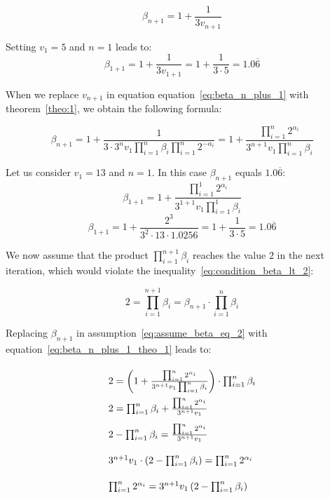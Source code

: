 \begin{equation}
\label{eq:beta_n_plus_1}
\beta_{n+1}=1+\frac{1}{3v_{n+1}}
\end{equation}

\begin{example}
	Setting $v_1=5$ and $n=1$ leads to:
	\[
	\beta_{1+1}=1+\frac{1}{3v_{1+1}}=1+\frac{1}{3\cdot5}=1.0\overline{6}
	\]
\end{example}

When we replace $v_{n+1}$ in equation equation~\ref{eq:beta_n_plus_1} with theorem~\ref{theo:1}, we obtain the following formula:

\begin{equation}
\label{eq:beta_n_plus_1_theo_1}
\beta_{n+1}=1+\frac{1}{3\cdot3^nv_1\prod_{i=1}^{n}\beta_i\prod_{i=1}^{n}2^{-\alpha_i}}=1+\frac{\prod_{i=1}^{n}2^{\alpha_i}}{3^{n+1}v_1\prod_{i=1}^{n}\beta_i}
\end{equation}

\begin{example}
Let us consider $v_1=13$ and $n=1$. In this case $\beta_{n+1}$ equals $1.0\overline{6}$:
\[
\beta_{1+1}=1+\frac{\prod_{i=1}^{1}2^{\alpha_i}}{3^{1+1}v_1\prod_{i=1}^{1}\beta_i}
\]
\[
\beta_{1+1}=1+\frac{2^3}{3^2\cdot13\cdot1.0256}=1+\frac{1}{3\cdot5}=1.0\overline{6}
\]
\end{example}

We now assume that the product $\prod_{i=1}^{n+1}\beta_i$ reaches the value $2$ in the next iteration, which would violate the inequality~\ref{eq:condition_beta_lt_2}:

\begin{equation}
\label{eq:assume_beta_eq_2}
2=\prod_{i=1}^{n+1}\beta_i=\beta_{n+1}\cdot\prod_{i=1}^{n}\beta_i
\end{equation}

Replacing $\beta_{n+1}$ in assumption~\ref{eq:assume_beta_eq_2} with equation~\ref{eq:beta_n_plus_1_theo_1} leads to:

\begin{equation}
\label{eq:prod_power_of_two}
\arraycolsep=1.4pt\def\arraystretch{2.2}\begin{array}{l}

2=\left(1+\frac{\prod_{i=1}^{n}2^{\alpha_i}}{3^{n+1}v_1\prod_{i=1}^{n}\beta_i}\right)\cdot\prod_{i=1}^{n}\beta_i\\
2=\prod_{i=1}^{n}\beta_i+\frac{\prod_{i=1}^{n}2^{\alpha_i}}{3^{n+1}v_1}\\
2-\prod_{i=1}^{n}\beta_i=\frac{\prod_{i=1}^{n}2^{\alpha_i}}{3^{n+1}v_1}\\
3^{n+1}v_1\cdot\left(2-\prod_{i=1}^{n}\beta_i\right) =\prod_{i=1}^{n}2^{\alpha_i}\\
\prod_{i=1}^{n}2^{\alpha_i}=3^{n+1}v_1\left(2-\prod_{i=1}^{n}\beta_i\right)
\end{array}
\end{equation}

